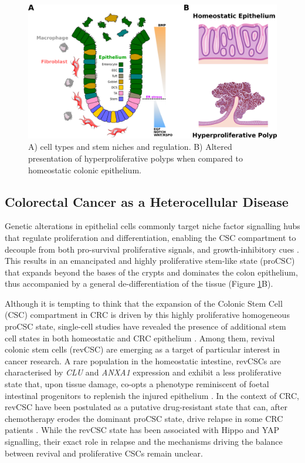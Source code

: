 \begin{figure}
    \centering
    \includegraphics{01intro/figs/1BIO_gutepithelia.png}
    \caption{A) cell types and stem niches and regulation. B) Altered presentation of hyperproliferative polyps when compared to homeostatic colonic epithelium.}
    \label{fig:1epi}
\end{figure}

\subsection{Colorectal Cancer as a Heterocellular Disease}

Genetic alterations in epithelial cells commonly target niche factor signalling hubs that regulate proliferation and differentiation, enabling the CSC compartment to decouple from both pro-survival proliferative signals, and growth-inhibitory cues \cite{sphyris_subversion_2021}. This results in an emancipated and highly proliferative stem-like state (proCSC) that expands beyond the bases of the crypts and dominates the colon epithelium, thus accompanied by a general de-differentiation of the tissue (Figure \ref{fig:1epi}B).

Although it is tempting to think that the expansion of the Colonic Stem Cell (CSC) compartment in CRC is driven by this highly proliferative homogeneous proCSC state, single-cell studies have revealed the presence of additional stem cell states in both homeostatic and CRC epithelium \cite{norkin_single-cell_2020, bankaitis_reserve_2018,barriga_mex3a_2017,bues_deterministic_2022}.
Among them, revival colonic stem cells (revCSC) are emerging as a target of particular interest in cancer research. A rare population in the homeostatic intestine, revCSCs are characterised by \emph{CLU} and \emph{ANXA1} expression and exhibit a less proliferative state that, upon tissue damage, co-opts a phenotype reminiscent of foetal intestinal progenitors to replenish the injured epithelium \cite{ayyaz_single-cell_2019}. 
In the context of CRC, revCSC have been postulated as a putative drug-resistant state that can, after chemotherapy erodes the dominant proCSC state, drive relapse in some CRC patients \cite{rehman_colorectal_2021,alvarez-varela_mex3a_2022}. While the revCSC state has been associated with Hippo and YAP signalling, their exact role in relapse and the mechanisms driving the balance between revival and proliferative CSCs remain unclear.

